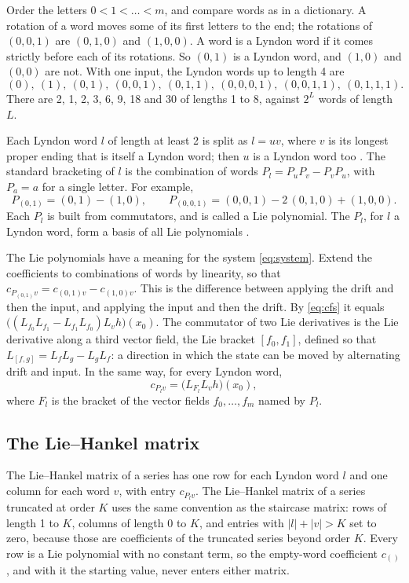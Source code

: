 \documentclass[11pt,a4paper]{article}
\theoremstyle{remark}
\begin{document}
Order the letters $0<1<\dots<m$, and compare words as in a dictionary.
A rotation of a word moves some of its first letters to the end; the rotations of $(0,0,1)$ are $(0,1,0)$ and $(1,0,0)$.
A word is a Lyndon word if it comes strictly before each of its rotations.
So $(0,1)$ is a Lyndon word, and $(1,0)$ and $(0,0)$ are not.
With one input, the Lyndon words up to length 4 are
\[(0),\ (1),\ (0,1),\ (0,0,1),\ (0,1,1),\ (0,0,0,1),\ (0,0,1,1),\ (0,1,1,1).\]
There are 2, 1, 2, 3, 6, 9, 18 and 30 of lengths 1 to 8, against $2^L$ words of length $L$.

Each Lyndon word $l$ of length at least 2 is split as $l=uv$, where $v$ is its longest proper ending that is itself a Lyndon word; then $u$ is a Lyndon word too \cite{ChenFoxLyndon1958}.
The standard bracketing of $l$ is the combination of words $P_l=P_uP_v-P_vP_u$, with $P_a=a$ for a single letter.
For example,
\[P_{(0,1)}=(0,1)-(1,0),\qquad P_{(0,0,1)}=(0,0,1)-2\,(0,1,0)+(1,0,0).\]
Each $P_l$ is built from commutators, and is called a Lie polynomial.
The $P_l$, for $l$ a Lyndon word, form a basis of all Lie polynomials \cite{Reutenauer1993}.

The Lie polynomials have a meaning for the system \eqref{eq:system}.
Extend the coefficients to combinations of words by linearity, so that $c_{P_{(0,1)}v}=c_{(0,1)v}-c_{(1,0)v}$.
This is the difference between applying the drift and then the input, and applying the input and then the drift.
By \eqref{eq:cfs} it equals $\bigl((L_{f_0}L_{f_1}-L_{f_1}L_{f_0})L_vh\bigr)(x_0)$.
The commutator of two Lie derivatives is the Lie derivative along a third vector field, the Lie bracket $[f_0,f_1]$, defined so that $L_{[f,g]}=L_fL_g-L_gL_f$: a direction in which the state can be moved by alternating drift and input.
In the same way, for every Lyndon word,
\begin{equation}\label{eq:liecoef}
c_{P_lv}=\bigl(L_{F_l}L_vh\bigr)(x_0),
\end{equation}
where $F_l$ is the bracket of the vector fields $f_0,\dots,f_m$ named by $P_l$.

\subsection{The Lie--Hankel matrix}
The Lie--Hankel matrix of a series has one row for each Lyndon word $l$ and one column for each word $v$, with entry $c_{P_lv}$.
The Lie--Hankel matrix of a series truncated at order $K$ uses the same convention as the staircase matrix: rows of length 1 to $K$, columns of length 0 to $K$, and entries with $|l|+|v|>K$ set to zero, because those are coefficients of the truncated series beyond order $K$.
Every row is a Lie polynomial with no constant term, so the empty-word coefficient $c_{()}$, and with it the starting value, never enters either matrix.
\end{document}
